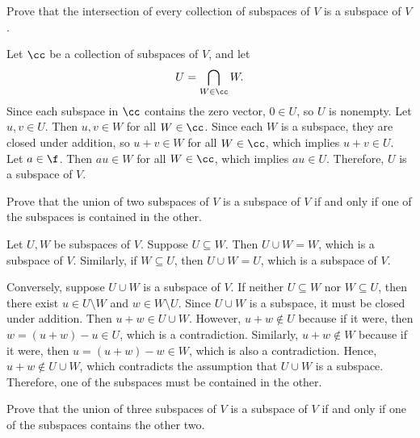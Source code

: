 \begin{exercise}[1c11]
    Prove that the intersection of every collection of subspaces of $V$ is a subspace of $V$.
\end{exercise}

\begin{sol}
    Let $\cc$ be a collection of subspaces of $V$, and let
    \[U = \bigcap_{W \in \cc} W.\]
    Since each subspace in $\cc$ contains the zero vector, $0 \in U$, so $U$ is nonempty. Let $u, v \in U$. Then $u, v \in W$ for all $W \in \cc$. Since each $W$ is a subspace, they are closed under addition, so $u + v \in W$ for all $W \in \cc$, which implies $u + v \in U$. Let $a \in \f$. Then $au \in W$ for all $W \in \cc$, which implies $au \in U$. Therefore, $U$ is a subspace of $V$.
\end{sol}

\begin{exercise}[1c12]
    Prove that the union of two subspaces of $V$ is a subspace of $V$ if and only if one of the subspaces is contained in the other.
\end{exercise}

\begin{sol}
    Let $U, W$ be subspaces of $V$. Suppose $U \subseteq W$. Then $U \cup W = W$, which is a subspace of $V$. Similarly, if $W \subseteq U$, then $U \cup W = U$, which is a subspace of $V$.

    Conversely, suppose $U \cup W$ is a subspace of $V$. If neither $U \subseteq W$ nor $W \subseteq U$, then there exist $u \in U \setminus W$ and $w \in W \setminus U$. Since $U \cup W$ is a subspace, it must be closed under addition. Then $u + w \in U \cup W$. However, $u + w \notin U$ because if it were, then $w = (u + w) - u \in U$, which is a contradiction. Similarly, $u + w \notin W$ because if it were, then $u = (u + w) - w \in W$, which is also a contradiction. Hence, $u + w \notin U \cup W$, which contradicts the assumption that $U \cup W$ is a subspace. Therefore, one of the subspaces must be contained in the other.
\end{sol}

\begin{exercise}[1c13]
    Prove that the union of three subspaces of $V$ is a subspace of $V$ if and only if one of the subspaces contains the other two.
\end{exercise}

